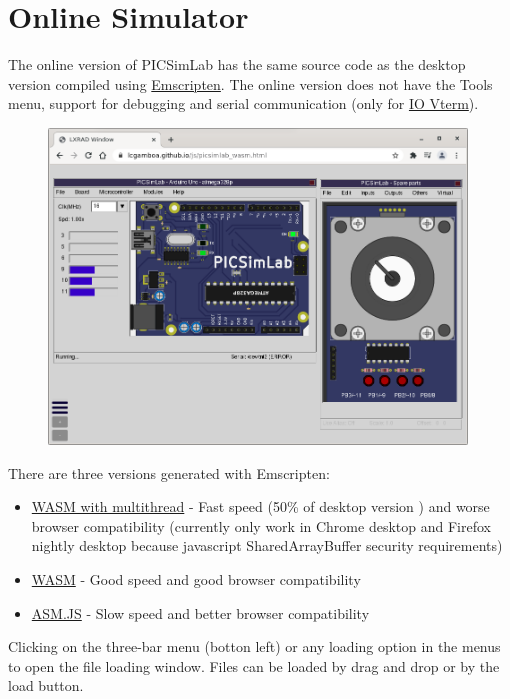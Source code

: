 \chapter{Online Simulator}

The online version of PICSimLab has the same source code as the desktop version compiled using 
\href{https://emscripten.org/}{Emscripten}. The online version does not have the Tools menu, support for 
debugging and serial communication (only for \hyperlink{def:vterm}{IO Vterm}). 

\begin{figure}[H]
\center
\includegraphics[width=0.99\textwidth]{img/online.png} 
\end{figure} 

There are three versions generated with Emscripten: 

\begin{itemize}
\item \href{https://lcgamboa.github.io/js/picsimlab_mt.html}{WASM with multithread} - Fast speed (50\% of desktop version )
and worse browser compatibility (currently only work in Chrome desktop and Firefox nightly desktop because 
javascript SharedArrayBuffer security requirements)
\item \href{https://lcgamboa.github.io/js/picsimlab_wasm.html}{WASM} - Good speed and good browser compatibility
\item \href{https://lcgamboa.github.io/js/picsimlab_asmjs.html}{ASM.JS} - Slow speed and better browser compatibility
\end{itemize}

Clicking on the three-bar menu (botton left) or any loading option in the menus to open the 
file loading window.
Files can be loaded by drag and drop or by the load button. 

